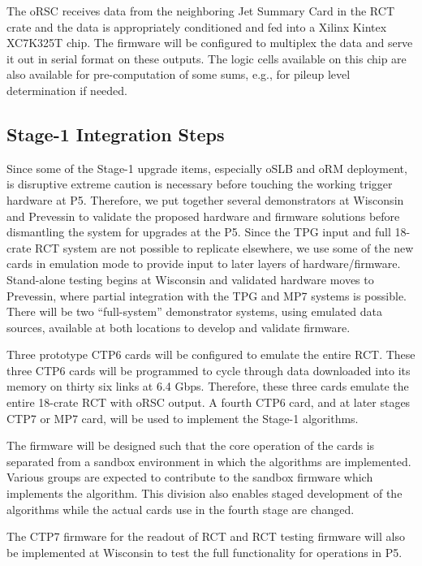 The oRSC receives data from the neighboring Jet Summary Card in the
RCT crate and the data is appropriately conditioned and fed into a Xilinx Kintex
XC7K325T chip. The firmware will be configured to multiplex the data and serve it out
in serial format on these outputs.  The logic cells available on this
chip are also available for pre-computation of some sums, e.g., for
pileup level determination if needed.

\subsection{Stage-1 Integration Steps}

 Since some of the Stage-1 upgrade items,
especially oSLB and oRM deployment, is disruptive extreme caution is
necessary before touching the working trigger hardware at P5.
Therefore, we put together several demonstrators at Wisconsin and
Prevessin to validate the proposed hardware and firmware solutions
before dismantling the system for upgrades at the P5.  Since the TPG
input and full 18-crate RCT system are not possible to replicate
elsewhere, we use some of the new cards in emulation mode to provide
input to later layers of hardware/firmware.  Stand-alone testing
begins at Wisconsin and validated hardware moves to Prevessin, where
partial integration with the TPG and MP7 systems is possible.  There
will be two ``full-system'' demonstrator systems, using emulated data
sources, available at both locations to develop and validate firmware.

Three prototype CTP6 cards will be configured to emulate the entire RCT.
These three CTP6 cards will be programmed to cycle through data downloaded
into its memory on thirty six links at 6.4 Gbps.  Therefore, these three
cards emulate the entire 18-crate RCT with oRSC output.  A fourth CTP6
card, and at later stages CTP7 or MP7 card, will be used to implement
the Stage-1 algorithms.  

The firmware will be designed such that the core operation of the cards
is separated from a sandbox environment in which the algorithms are 
implemented.  Various groups are expected to contribute to the sandbox
firmware which implements the algorithm.  This division also enables
staged development of the algorithms while the actual cards use in
the fourth stage are changed. 

The CTP7 firmware for the readout of RCT and RCT testing firmware will
also be implemented at Wisconsin to test the full functionality for operations
in P5.

